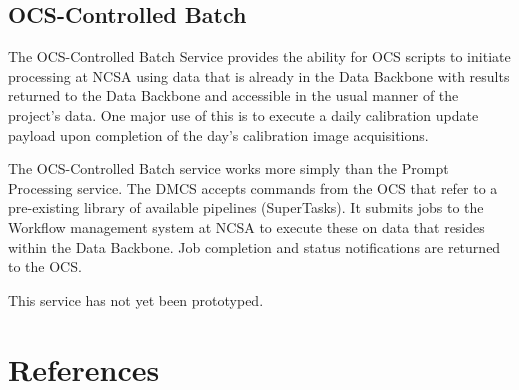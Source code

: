 \documentclass[DM,toc]{lsstdoc}
\begin{document}
\subsection{OCS-Controlled Batch}\label{ocs-controlled-batch}

The OCS-Controlled Batch Service provides the ability for OCS scripts to
initiate processing at NCSA using data that is already in the Data Backbone
with results returned to the Data Backbone and accessible in the usual manner
of the project’s data.  One major use of this is to execute a daily calibration
update payload upon completion of the day's calibration image acquisitions.

The OCS-Controlled Batch service works more simply than the Prompt Processing
service.  The DMCS accepts commands from the OCS that refer to a pre-existing
library of available pipelines (SuperTasks).  It submits jobs to the Workflow
management system at NCSA to execute these on data that resides within the Data
Backbone.  Job completion and status notifications are returned to the OCS.

This service has not yet been prototyped.

\section{References\label{references}}
\renewcommand{\refname}{}

\end{document}
